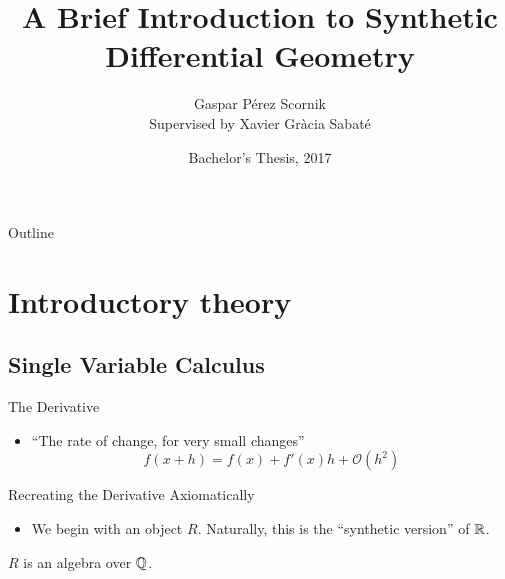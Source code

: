 \documentclass{beamer}
\title[Synthetic Differential Geometry] %
{A Brief Introduction to Synthetic Differential Geometry}
\author
{
  Gaspar P\'erez Scornik\\
  {\footnotesize Supervised by Xavier Gr\`acia Sabat\'e}
}
\institute[UPC] %
{
  Universitat Polit\'ecnica de Catalunya\\
  Faculty of Mathematics and Statistics
}
\date[BSCT 2017] %
{Bachelor's Thesis, 2017}
\begin{document}
\begin{frame}
  \titlepage
\end{frame}

\begin{frame}{Outline}
  \tableofcontents
\end{frame}





\section{Introductory theory}

\subsection{Single Variable Calculus}

\begin{frame}{The Derivative}

  \begin{itemize}
  \item
    ``The rate of change, for very small changes''
    \begin{equation*}
      f(x+h) = f(x) + f'(x)h + \mathcal O(h^2)
    \end{equation*}
  \end{itemize}
\end{frame}

\begin{frame}{Recreating the Derivative Axiomatically}

  \begin{itemize}
  \item 
    We begin with an object \( R \). Naturally, this is the ``synthetic version''
    of \( \mathbb{R} \).
  \end{itemize}
  \pause
  \begin{axiom}
    \( R \) is an algebra over \( \mathbb{Q} \).
  \end{axiom}
\end{frame}
\end{document}
